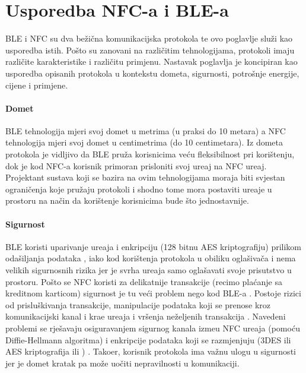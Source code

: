 \chapter{Usporedba NFC-a i BLE-a}


BLE i NFC su dva be\v{z}i\v{c}na komunikacijska protokola te ovo poglavlje slu\v{z}i kao usporedba istih. Po\v{s}to su zanovani na razli\v{c}itim tehnologijama, protokoli imaju razli\v{c}ite karakteristike i razli\v{c}itu primjenu. 
Nastavak poglavlja je koncipiran kao usporedba opisanih protokola u kontekstu dometa, sigurnosti, potro\v{s}nje energije, cijene i primjene. 

\subsubsection{Domet}

BLE tehnologija mjeri svoj domet u metrima (u praksi do 10 metara) a NFC tehnologija mjeri svoj domet u centimetrima (do 10 centimetara). Iz dometa protokola je vidljivo da BLE pru\v{z}a korisnicima ve\'{c}u fleksibilnost pri kori\v{s}tenju, dok je kod NFC-a korisnik primoran prisloniti svoj ure\dj aj na NFC ure\dj aj. Projektant sustava koji se bazira na ovim tehnologijama moraja biti svjestan ograni\v{c}enja koje pru\v{z}aju protokoli i shodno tome mora postaviti ure\dj aje u prostoru na na\v{c}in da kori\v{s}tenje korisnicima bude \v{s}to jednostavnije.

\subsubsection{Sigurnost}

BLE koristi uparivanje ure\dj aja i enkripciju (128 bitnu AES kriptografiju) prilikom oda\v{s}iljanja podataka  \cite{bleSecurity}, iako kod kori\v{s}tenja protokola u obiliku ogla\v{s}iva\v{c}a i nema velikih sigurnosnih rizika jer je svrha ure\dj aja samo ogla\v{s}avati svoje prisutstvo u prostoru.  Po\v{s}to se NFC koristi za delikatnije transakcije (recimo pla\'{c}anje sa kreditnom karticom) sigurnost je tu ve\'{c}i problem nego kod BLE-a . Postoje rizici od prislu\v{s}kivanja transakcije, manipulacije podataka koji se prenose kroz komunikacijski kanal i kra\dj e ure\dj aja i vr\v{s}enja ne\v{z}eljenih transakcija \cite{nfcSecurity}. Navedeni problemi se rje\v{s}avaju osiguravanjem sigurnog kanala izme\dj u NFC ure\dj aja (pomo\'{c}u Diffie-Hellmann algoritma) i enkripcije podataka koji se razmjenjuju (3DES ili AES kriptografija ili ) \cite{nfcSecurityTwo}. Tako\dj er, korisnik protokola ima va\v{z}nu ulogu u sigurnosti jer je domet kratak pa mo\v{z}e uo\v{c}iti nepravilnosti u komunikaciji.

